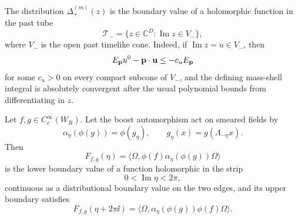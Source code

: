 The distribution \(\Delta_+^{(m)}(z)\) is the boundary value of a holomorphic
function in the past tube
\[
  \mathcal T_-=\{z\in\mathbb C^D:\operatorname{Im}z\in V_-\},
\]
where \(V_-\) is the open past timelike cone.  Indeed, if
\(\operatorname{Im}z=u\in V_-\), then
\[
  E_{\bf p}u^0-{\bf p}\cdot{\bf u}\le -c_u E_{\bf p}
\]
for some \(c_u>0\) on every compact subcone of \(V_-\), and the defining
mass-shell integral is absolutely convergent after the usual polynomial
bounds from differentiating in \(z\).

\begin{theorem}
\label{thm:unruh-free-scalar-wedge-kms}
Let \(f,g\in C_c^\infty(W_R)\).  Let the boost automorphism act on smeared
fields by
\[
  \alpha_\eta(\phi(g))=\phi(g_\eta),
  \qquad
  g_\eta(x)=g(\Lambda_{-\eta}x).
\]
Then
\[
  F_{f,g}(\eta)
  =
  \langle\Omega,\phi(f)\alpha_\eta(\phi(g))\Omega\rangle
\]
is the lower boundary value of a function holomorphic in the strip
\[
  0<\operatorname{Im}\eta<2\pi ,
\]
continuous as a distributional boundary value on the two edges, and its
upper boundary satisfies
\begin{equation}
  F_{f,g}(\eta+2\pi\ii)
  =
  \langle\Omega,\alpha_\eta(\phi(g))\phi(f)\Omega\rangle .
  \label{eq:unruh-free-two-point-kms-boundary}
\end{equation}
\end{theorem}

